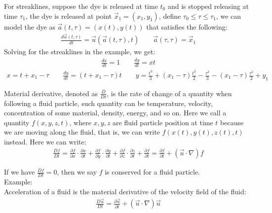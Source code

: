 \documentclass[11pt]{book}
\theoremstyle{break}
\theoremstyle{break}
\newcommand{\example}{\color{green}Example: \color{black}}
\begin{document}
\hfill\break
For streaklines, suppose the dye is released at time $t_0$ and is stopped releasing at time $\tau_1$, the dye is released at point $\vec{x}_1 = (x_1,y_1)$, define $\tau_0 \leq \tau \leq \tau_1$, we can model the dye as $\vec{a}(t,\tau)=(x(t),y(t))$ that satisfies the following:
\begin{align*}
\frac{d\vec{a}(t,\tau)}{dt} = \vec{u}(\vec{a}(t,\tau),t) \qquad \vec{a}(\tau,\tau) = \vec{x}_1
\end{align*}
Solving for the streaklines in the example, we get:
\begin{align*}
\frac{dx}{dt} = 1 \qquad \frac{dy}{dt} = xt
\end{align*}
\begin{align*}
x = t+x_1 - \tau \qquad \frac{dy}{dt} = (t+x_1 - \tau) t \qquad y = \frac{t^3}{3}+(x_1 -\tau) \frac{t^2}{2} - \frac{\tau^3}{3} - (x_1 - \tau) \frac{\tau^2}{2} + y_1
\end{align*}


\newpage
Material derivative, denoted as $\frac{D}{Dt}$, is the rate of change of a quantity when following a fluid particle, such quantity can be temperature, velocity, concentration of some material, density, energy, and so on. Here we call a quantity $f(x,y,z,t)$, where $x,y,z$ are fluid particle position at time $t$ because we are moving along the fluid, that is, we can write $f(x(t),y(t),z(t),t)$ instead. Here we can write:
\begin{align*}
\frac{Df}{Dt} = \frac{\partial f}{\partial x} \cdot \frac{\partial x}{\partial t} + \frac{\partial f}{\partial	y}\cdot \frac{\partial y}{\partial t} + \frac{\partial f}{\partial z}\cdot \frac{\partial z}{\partial t} + \frac{\partial f}{\partial t} = \frac{\partial f}{\partial t} + (\vec{u}\cdot \nabla) f
\end{align*} 

If we have $\frac{Df}{Dt} = 0$, then we say $f$ is conserved for a fluid particle. \\

\example \\
Acceleration of a fluid is the material derivative of the velocity field of the fluid:
\begin{align*}
\frac{D\vec{u}}{Dt} = \frac{\partial \vec{u}}{\partial t} + (\vec{u} \cdot \nabla) \vec{u}
\end{align*}
\end{document}
